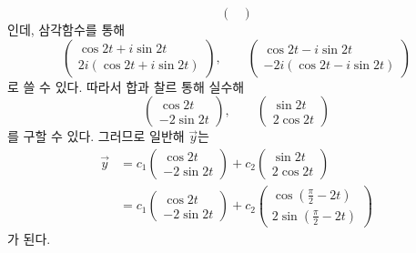 \documentclass[../engineering_mathematics_lecture_note.tex]{subfiles}
\begin{document}
\begin{enumerate}
\begin{equation*}
\begin{pmatrix}
            \end{pmatrix}
        \end{equation*}
        인데, 삼각함수를 통해
        \begin{equation*}
            \begin{pmatrix}
                \cos 2t + i \sin 2t\\
                2i(\cos 2t + i \sin 2t)
            \end{pmatrix}, \qquad \begin{pmatrix}
                \cos 2t - i \sin 2t\\
                -2i (\cos 2t - i \sin 2t)
            \end{pmatrix}
        \end{equation*}
        로 쓸 수 있다.
        따라서 합과 찰르 통해 실수해
        \begin{equation*}
            \begin{pmatrix}
                \cos 2t\\
                -2 \sin 2t
            \end{pmatrix}, \qquad \begin{pmatrix}
                \sin 2t\\
                2\cos 2t
            \end{pmatrix}
        \end{equation*}
        를 구할 수 있다.
        그러므로 일반해 $\vec y$는
        \begin{align*}
            \vec y &= c_1 \begin{pmatrix}
                \cos 2t\\ -2 \sin 2t
            \end{pmatrix} + c_2 \begin{pmatrix}
                \sin 2t\\ 2 \cos 2t
            \end{pmatrix}\\
                   &= c_1 \begin{pmatrix}
                \cos 2t\\ -2 \sin 2t
            \end{pmatrix} + c_2 \begin{pmatrix}
            \cos \left( \frac{\pi}{2} - 2t \right)\\ 2 \sin \left( \frac{\pi}{2} -2t \right)
        \end{pmatrix}
        \end{align*}
        가 된다.


\end{enumerate}
\end{document}
